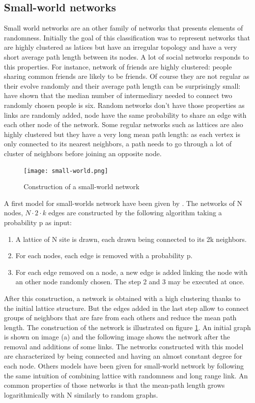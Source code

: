 \documentclass[a4paper, 12pt]{report}
\begin{document}
\subsection{Small-world networks}
Small world networks are an other family of networks that presents elements of randomness. Initially the goal of this classification was to represent networks that are highly clustered as latices but have an irregular topology and have a very short average path length between its nodes. A lot of social networks responds to this properties. For instance, network of friends are highly clustered: people sharing common friends are likely to be friends. Of course they are not regular as their evolve randomly and their average path length can be surprisingly small: \cite{milgram} have shown that the median number of intermediary needed to connect two randomly chosen people is six. Random networks don't have those properties as links are randomly added, node have the same probability to share an edge with each other node of the network. Some regular networks such as lattices are also highly clustered but they have a very long mean path length: as each vertex is only connected to its nearest neighbors, a path needs to go through a lot of cluster of neighbors before joining an opposite node. \citep{complex_networks} \\

\begin{figure}
\centering
\texttt{[image: small-world.png]}
\caption{Construction of a small-world network \citep{small-world}}
\label{small-world_pictures}
\end{figure}

A first model for small-worlds network have been given by \cite{globalClustering1}. The networks of N nodes, $N \cdot 2 \cdot k$ edges are constructed by the following algorithm taking a probability p as input:
\begin{enumerate}
\item A lattice of N site is drawn, each drawn being connected to its 2k neighbors.
\item For each nodes, each edge is removed with a probability p. 
\item For each edge removed on a node, a new edge is added linking the node with an other node randomly chosen. The step 2 and 3 may be executed at once.
\end{enumerate}
After this construction, a network is obtained with a high clustering thanks to the initial lattice structure. But the edges added in the last step allow to connect groups of neighbors that are fare from each others and reduce the mean path length. The construction of the network is illustrated on figure \ref{small-world_pictures}. An initial graph is shown on image (a) and the following image shows the network after the removal and additions of some links. The networks constructed with this model are characterized by being connected and having an almost constant degree for each node. Others models have been given for small-world network by following the same intuition of combining lattice with randomness and long range link. An common properties of those networks is that the mean-path length grows logarithmically with N  similarly to random graphs.\citep{small-world, complex_networks}
\end{document}
